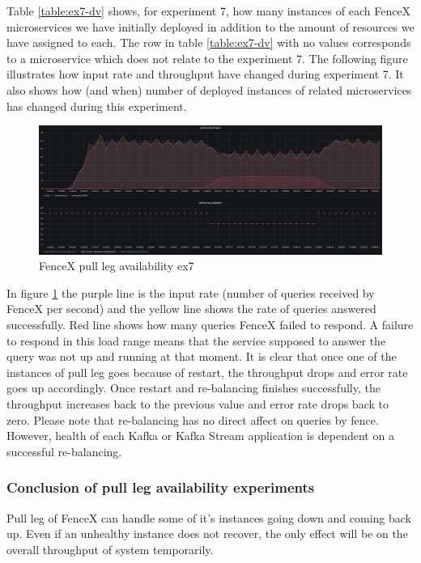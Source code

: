 \documentclass[a4]{report}
\begin{document}
    Table \ref{table:ex7-dv} shows, for experiment 7, how many instances of each FenceX microservices we have initially
    deployed in addition to the amount of resources we have assigned to each.
    The row in table \ref{table:ex7-dv} with no values corresponds to a microservice which does not relate to the
    experiment 7.
    The following figure illustrates how input rate and throughput have changed during experiment 7.
    It also shows how (and when) number of deployed instances of related microservices has changed during this
    experiment.

    \begin{figure}
        \caption{FenceX pull leg availability ex7}
        \label{fig:ex7}
        \includegraphics[scale=0.5]{images/evaluation/ex7-benchmarking-ongoing-2per10sec.png}
    \end{figure}

    \clearpage

    In figure \ref{fig:ex7} the purple line is the input rate (number of queries received by FenceX per
    second) and the yellow line shows the rate of queries answered successfully.
    Red line shows how many queries FenceX failed to respond.
    A failure to respond in this load range means that the service supposed to answer the query was not
    up and running at that moment.
    It is clear that once one of the instances of pull leg goes because of restart, the throughput drops and error
    rate goes up accordingly.
    Once restart and re-balancing finishes successfully, the throughput increases back to the previous
    value and error rate drops back to zero.
    Please note that re-balancing has no direct affect on queries by fence.
    However, health of each Kafka or Kafka Stream application is dependent on a successful re-balancing.

    \subsubsection{Conclusion of pull leg availability experiments}
    Pull leg of FenceX can handle some of it's instances going down and coming back up.
    Even if an unhealthy instance does not recover, the only effect will be on the overall throughput of system
    temporarily.
\end{document}
